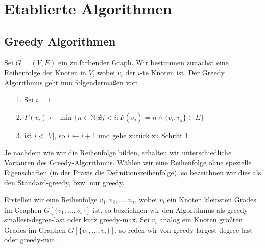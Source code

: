 \documentclass[11pt]{article}
\begin{document}
\section{Etablierte Algorithmen}

\subsection{Greedy Algorithmen}

Sei $G=(V,E)$ ein zu färbender Graph.
Wir bestimmen zunächst eine Reihenfolge der Knoten in $V$, wobei $v_i$ der $i$-te Knoten ist.
Der Greedy Algorithmus geht nun folgendermaßen vor:
\begin{itemize}
\item[1.] Sei $i=1$
\item[2.] $F(v_i) \leftarrow \min\{n\in\mathbb{N}|\nexists j < i: F(v_j)=n\land \{v_i, v_j\}\in E\}$
\item[3.] ist $i<|V|$, so $i\leftarrow i+1$ und gehe zurück zu Schritt 1 
\end{itemize}

Je nachdem wie wir die Reihenfolge bilden, erhalten wir unterschiedliche Varianten des Greedy-Algorithmus.
Wählen wir eine Reihenfolge ohne spezielle Eigenschaften (in der Praxis die Definitionsreihenfolge),
so bezeichnen wir dies als den Standard-greedy, bzw. nur greedy.

Erstellen wir eine Reihenfolge $v_1,v_2,\ldots,v_n$, wobei $v_i$ ein Knoten kleinsten Grades im Graphen $G[\{v_1,\ldots,v_i\}]$ ist, so bezeichnen wir den Algorithmus als greedy-smallest-degree-last oder kurz greedy-max.
Sei $v_i$ analog ein Knoten größten Grades im Graphen $G[\{v_1,\ldots,v_i\}]$, so reden wir von greedy-largest-degree-last oder greedy-min.
\end{document}
